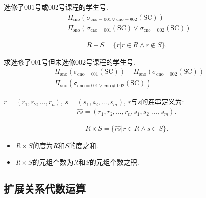 \begin{example}
选修了001号或002号课程的学生号.
\begin{align*}
    &\Pi_{\text{sno}}(\sigma_{\text{cno}=001\lor \text{cno}=002}(\text{SC})) \\
    &\Pi_{\text{sno}}(\sigma_{\text{cno}=001}(\text{SC})\lor \sigma_{\text{cno}=002}(\text{SC}))
\end{align*}
\end{example}

\begin{definition}[差运算]
\begin{align*}
    R-S =\{r|r\in R\land r \not\in S\}.
\end{align*}
\end{definition}

\begin{example}
求选修了001号但未选修002号课程的学生号.
\begin{align*}
    &\Pi_{\text{sno}}(\sigma_{\text{cno}=001}(\text{SC})) - \Pi_{\text{sno}}(\sigma_{\text{cno}=002}(\text{SC})) \\
   &\Pi_{\text{sno}}(\sigma_{\text{cno}=001\lor \text{cno}\neq 002}(\text{SC}))
\end{align*}
\end{example}

\begin{definition}[连串(Concatenation)]
$r=(r_1,r_2,...,r_n)$, $s=(s_1,s_2,...,s_m)$, $r$与$s$的连串定义为:
\begin{align*}
    \widehat{rs} = (r_1,r_2,...,r_n,s_1,s_2,...,s_m).
\end{align*}
\end{definition}

\begin{definition}[笛卡尔积]
\begin{align*}
    R\times S=\{\widehat{rs}|r\in R\land s\in S\}.
\end{align*}
\begin{itemize}
    \item $R\times S$的度为$R$和$S$的度之和.
    \item $R\times S$的元组个数为$R$和$S$的元组个数之积.
\end{itemize}
\end{definition}

\subsection{扩展关系代数运算}


